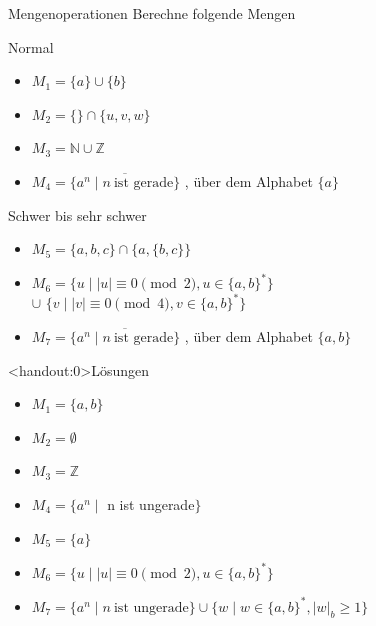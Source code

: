 {
\begin{frame}{Mengenoperationen}
    Berechne folgende Mengen
    \begin{alertblock}{Normal}
        \begin{itemize}
            \item $M_1 = \{a\}\cup \{b\}$
            \item $M_2 = \{\} \cap \{u, v, w\}$
            \item $M_3 = \mathbb{N} \cup \mathbb{Z}$
            \item $M_4 = \overline{\{a^{n}\mid n \ \text{ist gerade}\} }$ , über dem Alphabet $\{a\}$
        \end{itemize}
    \end{alertblock}
        \begin{alertblock}{Schwer bis sehr schwer}
        \begin{itemize}
            \item $M_5 = \{a, b, c\} \cap  \{a, \{b, c\}\}$
            \item $M_6 = \{u \mid |u| \equiv 0 \pmod 2, u \in \{a, b\}^{*}\}$\\\hspace{0.65cm}$\cup$ $\{v \mid |v| \equiv 0 \pmod 4, v \in \{a, b\}^{*}\}$
            \item $M_7 = \overline{\{a^{n} \mid n \ \text{ist gerade}\} }$ , über dem Alphabet $\{a,b\}$
        \end{itemize}
    \end{alertblock}
\end{frame}

\begin{frame}<handout:0>{Lösungen}
  \begin{itemize}[<+- | alert@+>]
        \item 
            $M_1 = \{a, b\}$
        \item
            $M_2 = \emptyset$
        \item
            $M_3 = \mathbb{Z}$
        \item
            $M_4 = \{a^{n} \mid$ n ist ungerade$\}$ 
        \item
            $M_5 = \{a\}$
        \item
            $M_6 = \{u \mid |u| \equiv 0 \pmod 2, u \in \{a, b\}^{*}\}$
        \item
            $M_7 = \{a^{n} \mid n \ \text{ist ungerade}\} \cup\{w \mid w\in\{a,b\}^{*}, |w|_b \geq 1\}$
    \end{itemize}
\end{frame}
}

